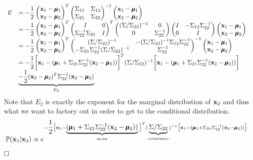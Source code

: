 \documentclass[11pt,a4paper]{article}
\begin{document}
\[\begin{array}{rl}
E&=-\dfrac{1}{2}\begin{pmatrix}
\textbf{x}_1-\pmb{\mu}_1\\\textbf{x}_2-\pmb{\mu}_2
\end{pmatrix}^T\begin{pmatrix}
\Sigma_{11}&\Sigma_{12}\\
\Sigma_{21}&\Sigma_{22}
\end{pmatrix}^{-1}\begin{pmatrix}
\textbf{x}_1-\pmb{\mu}_1\\\textbf{x}_2-\pmb{\mu}_2
\end{pmatrix}\\
&=-\dfrac{1}{2}\begin{pmatrix}
\textbf{x}_1-\pmb{\mu}_1\\
\textbf{x}_2-\pmb{\mu}_2
\end{pmatrix}^T
\begin{pmatrix}
I&0\\
\Sigma_{22}^{-1}\Sigma_{21}&I
\end{pmatrix}^T
\begin{pmatrix}
(\Sigma/\Sigma_{22})^{-1}&0\\
0&\Sigma_{22}^{-1}
\end{pmatrix}
\begin{pmatrix}
I&-\Sigma_{12}\Sigma_{22}^{-1}\\
0&I
\end{pmatrix}
\begin{pmatrix}
\textbf{x}_1-\pmb{\mu}_1\\
\textbf{x}_2-\pmb{\mu}_2
\end{pmatrix}\\
&=-\dfrac{1}{2}\begin{pmatrix}
\textbf{x}_1-\pmb{\mu}_1\\
\textbf{x}_2-\pmb{\mu}_2
\end{pmatrix}^T
\begin{pmatrix}
(\Sigma/\Sigma_{22})^{-1}&-(\Sigma/\Sigma_{22})^{-1}\Sigma_{12}\Sigma_{22}^{-1}\\
-\Sigma_{21}\Sigma_{22}^{-1}(\Sigma/\Sigma_{22})^{-1}&\Sigma_{22}^{-1}
\end{pmatrix}^{-1}
\begin{pmatrix}
\textbf{x}_1-\pmb{\mu}_1\\
\textbf{x}_2-\pmb{\mu}_2
\end{pmatrix}\\
&=-\dfrac{1}{2}\bigg[\textbf{x}_1-(\pmb{\mu}_1+\Sigma_{21}\Sigma_{22}^{-1}(\textbf{x}_2-\pmb{\mu}_2))\bigg]^T(\Sigma/\Sigma_{22})^{-1}\bigg[\textbf{x}_1-(\pmb{\mu}_1+\Sigma_{21}\Sigma_{22}^{-1}(\textbf{x}_2-\pmb{\mu}_2))\bigg]\\
&\underbrace{-\dfrac{1}{2}(\textbf{x}_2-\pmb{\mu}_2)^T\Sigma_{22}^{-1}(\textbf{x}_2-\pmb{\mu}_2)}_{E_2}
\end{array}\]
Note that $E_2$ is exactly the exponent for the marginal distribution of $\textbf{x}_2$ and thus what we want to factory out in order to get to the conditional distribution.
$$\mathbb{P}(\textbf{x}_1|\textbf{x}_2)\propto e^{-\dfrac{1}{2}\big[\textbf{x}_1-\underbrace{(\pmb{\mu}_1+\Sigma_{21}\Sigma_{22}^{-1}(\textbf{x}_2-\pmb{\mu}_2))}_{\text{mean}}\big]^T(\underbrace{\Sigma/\Sigma_{22}}_{\text{covariance}})^{-1}\big[\textbf{x}_1-(\pmb{\mu}_1+\Sigma_{21}\Sigma_{22}^{-1}(\textbf{x}_2-\pmb{\mu}_2))\big]}$$
$\hfill{\square}$
\end{document}
